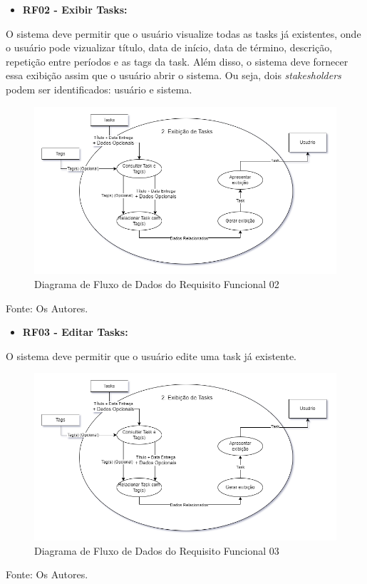 \documentclass[a4paper,12pt]{article}
\begin{document}
\pagebreak
\begin{itemize}
\item\textbf{RF02 - Exibir Tasks:}
\end{itemize}

O sistema deve permitir que o usuário visualize todas as tasks já existentes, onde o usuário pode vizualizar 
título, data de início, data de término, descrição, repetição entre períodos e as tags da task. Além disso, o 
sistema deve fornecer essa exibição assim que o usuário abrir o sistema. Ou seja, dois \textit{stakesholders} 
podem ser identificados: usuário e sistema.
\begin{figure}[H]
	\centering
	\includegraphics[scale=0.45]{DFDs/RF02.drawio.png}
	\caption{Diagrama de Fluxo de Dados do Requisito Funcional 02}
\end{figure}
\noindent Fonte: Os Autores.

\pagebreak
\begin{itemize}
\item\textbf{RF03 - Editar Tasks:}
\end{itemize}

O sistema deve permitir que o usuário edite uma task já existente.
\begin{figure}[H]
	\centering
	\includegraphics[scale=0.45]{DFDs/RF02.drawio.png}
	\caption{Diagrama de Fluxo de Dados do Requisito Funcional 03}
\end{figure}
\noindent Fonte: Os Autores.
\end{document}
